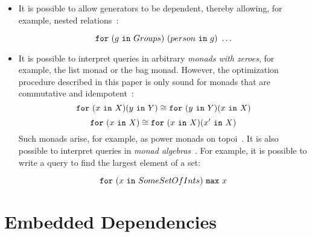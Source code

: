 \documentclass[preprint]{sigplanconf}
\newcommand{\FOR}{{\tt for} \ }
\newcommand{\IN}{ \ {\tt in} \ }
\begin{document}
\begin{itemize} 
\item  It is possible to allow generators to be dependent, thereby allowing, for example, nested relations~\cite{Popa99anequational}:
\begin{normalsize}
$$ \FOR (g \IN Groups) \ (person \IN g) \ \ldots $$
\end{normalsize}
\item It is possible to interpret queries in arbitrary {\it monads with zeroes}, for example, the list monad or the bag monad.  However, the  optimization procedure described in this paper is only sound for monads that are commutative and idempotent~\cite{Popa99anequational}:
$$
\FOR (x \IN X)(y \IN Y)  \cong \FOR (y \IN Y) (x \IN X) 
$$
$$
\FOR (x \IN X) \cong \FOR (x \IN X)(x' \IN X) 
$$
Such monads arise, for example, as power monads on topoi~\cite{BW}.  It is also possible to interpret queries in {\it monad algebras}~\cite{755736}.  For example, it is possible to write a query to find the largest element of a set: 
\begin{normalsize}
$$ \FOR (x \IN SomeSetOfInts) \ {\tt max} \ x $$
\end{normalsize}

\end{itemize}

\section{Embedded Dependencies}
\end{document}
